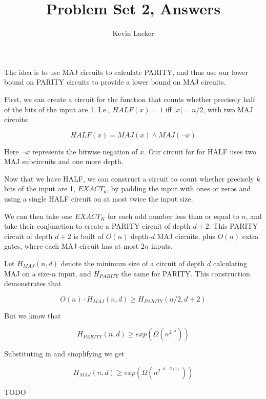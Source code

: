\documentclass{article}
\newenvironment{problem}[2][Problem]{\begin{trivlist}
\item[\hskip \labelsep {\bfseries #1}\hskip \labelsep {\bfseries #2.}]}{\end{trivlist}}
\begin{document}
\title{Problem Set 2, Answers}
\author{Kevin Lacker}
\maketitle

\begin{problem}{1}
  The idea is to use MAJ circuits to calculate PARITY, and thus use
  our lower bound on PARITY circuits to provide a lower bound on MAJ
  circuits.
  
  First, we can create a circuit for the function that counts whether
  precisely half of the bits of the input are 1. I.e., $HALF(x) = 1$ iff
  $|x| = n / 2$, with two MAJ circuits:

  \begin{equation}
    HALF(x) = MAJ(x) \wedge MAJ(\neg x)
  \end{equation}

  Here $\neg x$ represents the bitwise negation of $x$. Our circuit for
  for HALF uses two MAJ subcircuits and one more depth.

  Now that we have HALF, we can construct a circuit to count whether
  precisely $k$ bits of the input are 1, $EXACT_k$, by padding the input with
  ones or zeros and using a single HALF circuit on at most twice the
  input size.

  We can then take one $EXACT_K$ for each odd number less than or
  equal to $n$, and take their conjunction to create a PARITY circuit
  of depth $d+2$. This PARITY circuit of depth $d+2$ is built of
  $O(n)$ depth-$d$ MAJ circuits, plus $O(n)$ extra gates, where each
  MAJ circuit has at most $2n$ inputs.

  Let $H_{MAJ}(n, d)$ denote the minimum size of a circuit of depth
  $d$ calculating MAJ on a size-$n$ input, and $H_{PARITY}$ the same
  for PARITY. This construction demonstrates that

  \begin{equation}
    O(n) \cdot H_{MAJ}(n, d) \geq H_{PARITY}(n/2, d + 2)
  \end{equation}

  But we know that

  \begin{equation}
    H_{PARITY}(n, d) \geq exp(\Omega(n^{2^{-d}}))
  \end{equation}

  Substituting in and simplifying we get

  \begin{equation}
    H_{MAJ}(n, d) \geq exp(\Omega(n^{2^{-d-O(1)}}))
  \end{equation}
  
\end{problem}

\begin{problem}{2}
  TODO
\end{problem}
\end{document}
